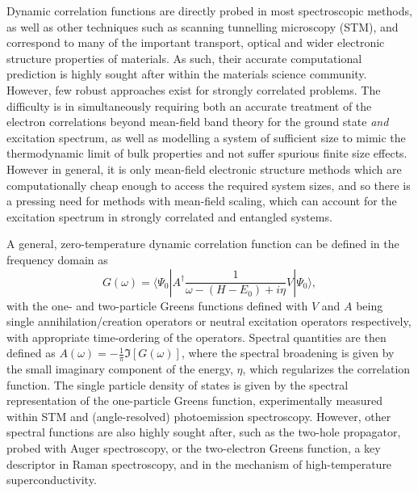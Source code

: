 \documentclass[aps,showpacs,twocolumn,nobibnotes]{revtex4}
\begin{document}
Dynamic correlation functions are directly probed in most spectroscopic methods, as well as other techniques such as scanning tunnelling microscopy (STM), 
and correspond to many of the important transport, optical and wider electronic structure properties of materials. 
As such, their accurate computational prediction is highly sought after within the materials science community. 
However, few robust approaches exist for strongly correlated problems\cite{Gali2013}. The difficulty is in simultaneously requiring both an accurate 
treatment of the electron correlations beyond mean-field band theory for the ground state {\em and} excitation spectrum, as well as modelling 
a system of sufficient size to mimic the thermodynamic limit of bulk properties and not suffer spurious finite size effects. 
However in general, it is only mean-field electronic structure methods which are computationally cheap enough to access the required system
sizes, and so there is a pressing need for methods with mean-field scaling, which can account for the excitation spectrum in strongly correlated 
and entangled systems.

A general, zero-temperature dynamic correlation function can be defined in the frequency domain as
\begin{equation}
    G(\omega) = \langle \Psi_0 | A^{\dagger} \frac{1}{\omega-(H-E_0)+i \eta} V | \Psi_0 \rangle , \label{eqn:intCorrFunc}
\end{equation}
with the one- and two-particle Greens functions defined with $V$ and $A$ being single annihilation/creation operators or neutral excitation
operators respectively, with appropriate time-ordering of the operators. Spectral quantities are then defined as $A(\omega)=-\frac{1}{\pi}\Im[G(\omega)]$,
where the spectral broadening is given by the small imaginary component of the energy, $\eta$, which regularizes the correlation function. The single particle
density of states is given by the spectral representation of the one-particle Greens function, experimentally measured within STM and (angle-resolved) photoemission
spectroscopy. However, other spectral functions are also highly sought after, such as the two-hole propagator, probed with Auger spectroscopy\cite{Mona2013}, or the two-electron
Greens function, a key descriptor in Raman spectroscopy, and in the mechanism of high-temperature superconductivity\cite{Millis2012,Millis2013}.
\end{document}
